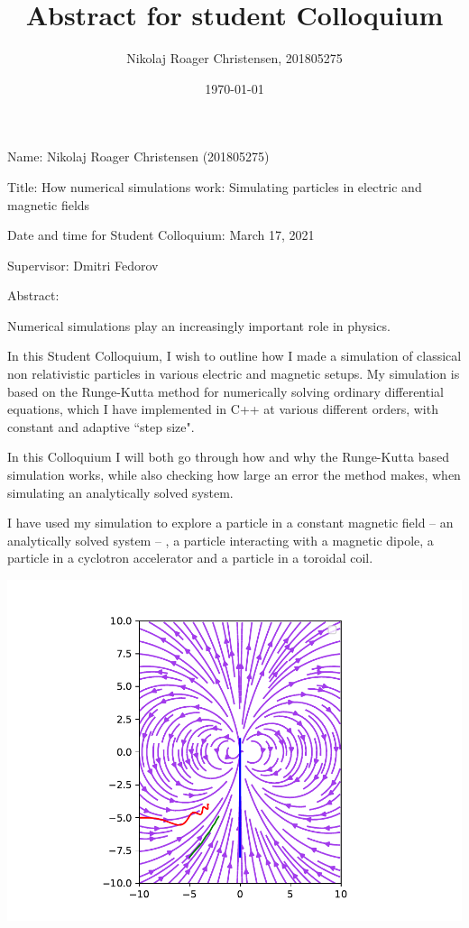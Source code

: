 \documentclass[a4paper,12pt,article]{memoir}
\title{Abstract for student Colloquium}
\author{Nikolaj Roager Christensen, 201805275}
\date{\today} %
\begin{document}
\maketitle


\noindent Name: Nikolaj Roager Christensen (201805275)

\noindent Title: How numerical simulations work: Simulating particles in electric and magnetic fields

\noindent Date and time for Student Colloquium: March 17, 2021

\noindent Supervisor: Dmitri Fedorov


\noindent Abstract:

Numerical simulations play an increasingly important role in physics.

In this Student Colloquium, I wish to outline how I made a simulation of classical non relativistic particles in various electric and magnetic setups. My simulation is based on the Runge-Kutta method for numerically solving ordinary differential equations, which I have implemented in C++ at various different orders, with constant and adaptive ``step size".

In this Colloquium I will both go through how and why the Runge-Kutta based simulation works, while also checking how large an error the method makes, when simulating an analytically solved system.

I have used my simulation to explore a particle in a constant magnetic field -- an analytically solved system -- , a particle interacting with a magnetic dipole, a particle in a cyclotron accelerator and a particle in a toroidal coil.

\begin{center}
\includegraphics[width=0.8\linewidth]{dipole1.pdf}


\end{center}
\end{document}
